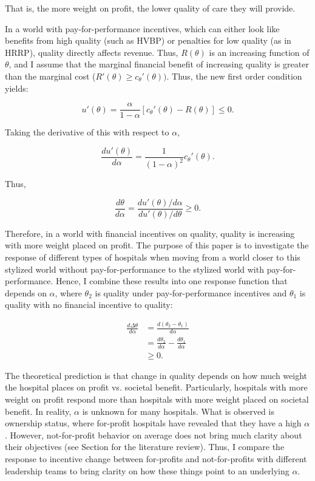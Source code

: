 \documentclass[12pt]{article}
\begin{document}
    \noindent That is, the more weight on profit, the lower quality of care they will provide.

    In a world with pay-for-performance incentives, which can either look like benefits from high quality (such as HVBP) or penalties for low quality (as in HRRP), quality directly affects revenue. Thus, $R(\theta)$ is an increasing function of $\theta$, and I assume that the marginal financial benefit of increasing quality is greater than the marginal cost ($R'(\theta)\geq c_{\theta}'(\theta))$. Thus, the new first order condition yields:

    $$u'(\theta) = \frac{\alpha}{1-\alpha} \left[c_{\theta}'(\theta)-R(\theta)\right] \leq 0.$$

    \noindent Taking the derivative of this with respect to $\alpha$,

    $$\frac{du'(\theta)}{d\alpha} = \frac{1}{(1-\alpha)^2}c_{\theta}'(\theta).$$

    Thus,

    $$\frac{d\theta}{d\alpha} = \frac{du'(\theta)/d\alpha}{du'(\theta)/d\theta}\geq0.$$

    Therefore, in a world with financial incentives on quality, quality is increasing with more weight placed on profit. The purpose of this paper is to investigate the response of different types of hospitals when moving from a world closer to this stylized world without pay-for-performance to the stylized world with pay-for-performance. Hence, I combine these results into one response function that depends on $\alpha$, where $\theta_2$ is quality under pay-for-performance incentives and $\theta_1$ is quality with no financial incentive to quality:

    \begin{align*}
        \frac{d\Delta\theta}{d\alpha}&=\frac{d(\theta_2-\theta_1)}{d\alpha}\\
        &=\frac{d\theta_2}{d\alpha}-\frac{d\theta_1}{d\alpha}\\
        &\geq 0.
    \end{align*}


    The theoretical prediction is that change in quality depends on how much weight the hospital places on profit vs. societal benefit. Particularly, hospitals with more weight on profit respond more than hospitals with more weight placed on societal benefit. In reality, $\alpha$ is unknown for many hospitals. What is observed is ownership status, where for-profit hospitals have revealed that they have a high $\alpha$. However, not-for-profit behavior on average does not bring much clarity about their objectives (see Section for the literature review). Thus, I compare the response to incentive change between for-profits and not-for-profits with different leadership teams to bring clarity on how these things point to an underlying $\alpha$.
    
\end{document}
